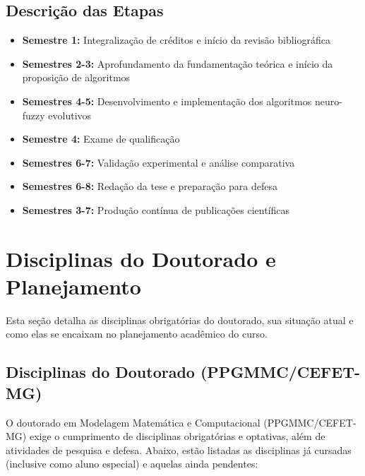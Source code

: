 \subsection{Descrição das Etapas}

\begin{itemize}
\item \textbf{Semestre 1:} Integralização de créditos e início da revisão bibliográfica
\item \textbf{Semestres 2-3:} Aprofundamento da fundamentação teórica e início da proposição de algoritmos
\item \textbf{Semestres 4-5:} Desenvolvimento e implementação dos algoritmos neuro-fuzzy evolutivos
\item \textbf{Semestre 4:} Exame de qualificação
\item \textbf{Semestres 6-7:} Validação experimental e análise comparativa
\item \textbf{Semestres 6-8:} Redação da tese e preparação para defesa
\item \textbf{Semestres 3-7:} Produção contínua de publicações científicas
\end{itemize}

\section{Disciplinas do Doutorado e Planejamento}

Esta seção detalha as disciplinas obrigatórias do doutorado, sua situação atual e como elas se encaixam no planejamento acadêmico do curso.

\subsection{Disciplinas do Doutorado (PPGMMC/CEFET-MG)}

O doutorado em Modelagem Matemática e Computacional (PPGMMC/CEFET-MG) exige o cumprimento de disciplinas obrigatórias e optativas, além de atividades de pesquisa e defesa. Abaixo, estão listadas as disciplinas já cursadas (inclusive como aluno especial) e aquelas ainda pendentes:

